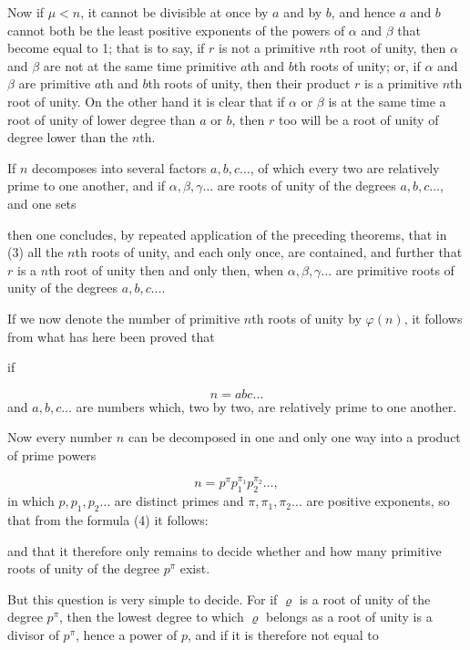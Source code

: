 Now if $\mu < n$, it cannot be divisible at once by $a$ and by $b$,
and hence $a$ and $b$ cannot both be the least positive exponents of the
powers of $\alpha$ and $\beta$ that become equal to 1; that is to say, if $r$ is not
a primitive $n$th root of unity, then $\alpha$ and $\beta$ are not at the same time
primitive $a$th and $b$th roots of unity; or, if
$\alpha$ and $\beta$ are primitive $a$th and $b$th roots of unity,
then their product $r$ is a primitive $n$th root of unity. On the other
hand it is clear that if $\alpha$ or $\beta$ is at the same time a root of unity of lower
degree than $a$ or $b$, then $r$ too will be a root of unity of degree lower than
the $n$th.

If $n$ decomposes into several factors $a, b, c \ldots$, of which every two are
relatively prime to one another, and if $\alpha, \beta, \gamma \ldots$ are roots of unity of the degrees
$a, b, c \ldots$, and one sets

then one concludes, by repeated application of the preceding theorems, that in (3) all
the $n$th roots of unity, and each only once, are contained, and further that
$r$ is a  $n$th root of unity then and only then, when
$\alpha, \beta, \gamma \ldots$ are primitive roots of unity of the degrees $a, b, c \ldots$.

If we now denote the number of primitive $n$th roots of unity by
$\varphi(n)$, it follows from what has here been proved that

if

\[
n = abc \ldots
\]
and $a, b, c \ldots$ are numbers which, two by two, are relatively prime to one another.

Now every number $n$ can be decomposed in one and only one way into a product of
prime powers

\[
n = p^\pi p_1^{\pi_1} p_2^{\pi_2} \ldots,
\]
in which $p, p_1, p_2 \ldots$ are distinct primes and $\pi, \pi_1, \pi_2 \ldots$
are positive exponents, so that from the formula (4) it follows:

and that it therefore only remains to decide whether and how many primitive
roots of unity of the degree $p^\pi$ exist.

But this question is very simple to decide. For if $\varrho$ is a
root of unity of the degree $p^\pi$, then the lowest degree to which $\varrho$ belongs as a
root of unity is a divisor of $p^\pi$, hence a power of $p$, and if it is
therefore not equal to
